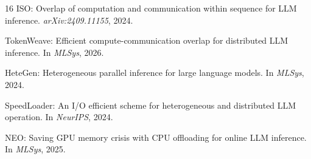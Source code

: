 \documentclass{article}
\begin{document}
\begin{thebibliography}{16}
{ISO}: Overlap of computation and communication within sequence for {LLM} inference.
\newblock \emph{arXiv:2409.11155}, 2024.

{TokenWeave}: Efficient compute-communication overlap for distributed {LLM} inference.
\newblock In \emph{MLSys}, 2026.

{HeteGen}: Heterogeneous parallel inference for large language models.
\newblock In \emph{MLSys}, 2024.

{SpeedLoader}: An {I/O} efficient scheme for heterogeneous and distributed {LLM} operation.
\newblock In \emph{NeurIPS}, 2024.

{NEO}: Saving {GPU} memory crisis with {CPU} offloading for online {LLM} inference.
\newblock In \emph{MLSys}, 2025.

\end{thebibliography}
\end{document}
